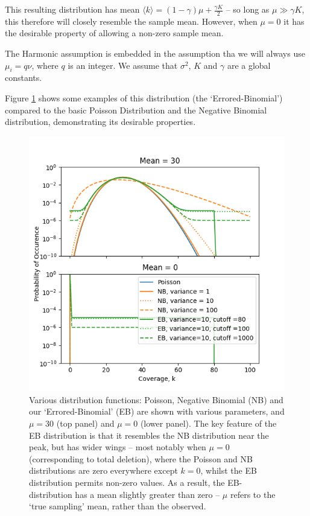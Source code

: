 \documentclass[fleqn,usenatbib]{mnras}
\begin{document}
				This resulting distribution has mean $\langle k \rangle = (1-\gamma)\mu + \frac{\gamma K}{2}$ -- so long as $\mu \gg \gamma K$, this therefore will closely resemble the sample mean. However, when $\mu = 0$ it has the desirable property of allowing a non-zero sample mean.

				The Harmonic assumption is embedded in the assumption tha we will always use $\mu_i = q \nu$, where $q$ is an integer. We assume that $\sigma^2$, $K$ and $\gamma$ are a global constants.

				Figure \ref{Fig:Distributions} shows some examples of this distribution (the `Errored-Binomial') compared to the basic Poisson Distribution and the Negative Binomial distribution, demonstrating its desirable properties.

				\begin{figure}
							\includegraphics*[width=\linewidth,keepaspectratio=true]{Distribution.png}
							\caption{Various distribution functions: Poisson, Negative Binomial (NB) and our `Errored-Binomial' (EB) are shown with various parameters, and $\mu =30$ (top panel) and $\mu = 0$ (lower panel). The key feature of the EB distribution is that it resembles the NB distribution near the peak, but has wider wings -- most notably when $\mu = 0$ (corresponding to total deletion), where the Poisson and NB distributions are zero everywhere except $k=0$, whilst the EB distribution permits non-zero values. As a result, the EB-distribution has a mean slightly greater than zero -- $\mu$ refers to the `true sampling' mean, rather than the observed.}\label{Fig:Distributions}
						\end{figure}
			
\end{document}
